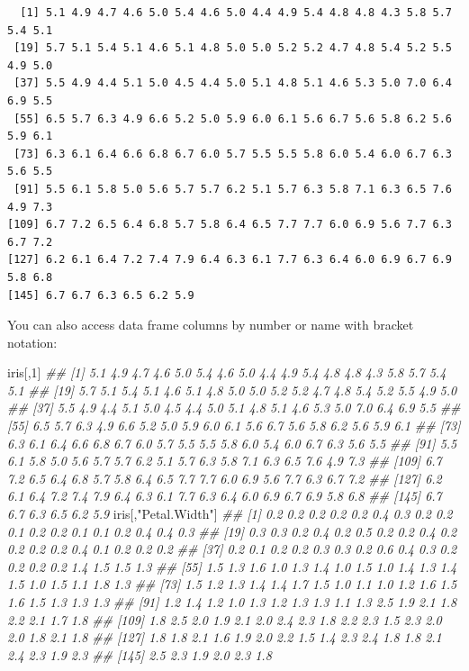 \documentclass[
  13,
  letterpaper,
]{report}
\newenvironment{Shaded}{\begin{snugshade}}{\end{snugshade}}
\newcommand{\DecValTok}[1]{\textcolor[rgb]{0.68,0.00,0.00}{#1}}
\newcommand{\DocumentationTok}[1]{\textcolor[rgb]{0.37,0.37,0.37}{\textit{#1}}}
\newcommand{\NormalTok}[1]{\textcolor[rgb]{0.00,0.23,0.31}{#1}}
\newcommand{\StringTok}[1]{\textcolor[rgb]{0.13,0.47,0.30}{#1}}
\begin{document}
\begin{verbatim}
  [1] 5.1 4.9 4.7 4.6 5.0 5.4 4.6 5.0 4.4 4.9 5.4 4.8 4.8 4.3 5.8 5.7 5.4 5.1
 [19] 5.7 5.1 5.4 5.1 4.6 5.1 4.8 5.0 5.0 5.2 5.2 4.7 4.8 5.4 5.2 5.5 4.9 5.0
 [37] 5.5 4.9 4.4 5.1 5.0 4.5 4.4 5.0 5.1 4.8 5.1 4.6 5.3 5.0 7.0 6.4 6.9 5.5
 [55] 6.5 5.7 6.3 4.9 6.6 5.2 5.0 5.9 6.0 6.1 5.6 6.7 5.6 5.8 6.2 5.6 5.9 6.1
 [73] 6.3 6.1 6.4 6.6 6.8 6.7 6.0 5.7 5.5 5.5 5.8 6.0 5.4 6.0 6.7 6.3 5.6 5.5
 [91] 5.5 6.1 5.8 5.0 5.6 5.7 5.7 6.2 5.1 5.7 6.3 5.8 7.1 6.3 6.5 7.6 4.9 7.3
[109] 6.7 7.2 6.5 6.4 6.8 5.7 5.8 6.4 6.5 7.7 7.7 6.0 6.9 5.6 7.7 6.3 6.7 7.2
[127] 6.2 6.1 6.4 7.2 7.4 7.9 6.4 6.3 6.1 7.7 6.3 6.4 6.0 6.9 6.7 6.9 5.8 6.8
[145] 6.7 6.7 6.3 6.5 6.2 5.9
\end{verbatim}

You can also access data frame columns by number or name with bracket
notation:

\begin{Shaded}
\begin{Highlighting}[]
\NormalTok{iris[,}\DecValTok{1}\NormalTok{]}
\DocumentationTok{\#\#   [1] 5.1 4.9 4.7 4.6 5.0 5.4 4.6 5.0 4.4 4.9 5.4 4.8 4.8 4.3 5.8 5.7 5.4 5.1}
\DocumentationTok{\#\#  [19] 5.7 5.1 5.4 5.1 4.6 5.1 4.8 5.0 5.0 5.2 5.2 4.7 4.8 5.4 5.2 5.5 4.9 5.0}
\DocumentationTok{\#\#  [37] 5.5 4.9 4.4 5.1 5.0 4.5 4.4 5.0 5.1 4.8 5.1 4.6 5.3 5.0 7.0 6.4 6.9 5.5}
\DocumentationTok{\#\#  [55] 6.5 5.7 6.3 4.9 6.6 5.2 5.0 5.9 6.0 6.1 5.6 6.7 5.6 5.8 6.2 5.6 5.9 6.1}
\DocumentationTok{\#\#  [73] 6.3 6.1 6.4 6.6 6.8 6.7 6.0 5.7 5.5 5.5 5.8 6.0 5.4 6.0 6.7 6.3 5.6 5.5}
\DocumentationTok{\#\#  [91] 5.5 6.1 5.8 5.0 5.6 5.7 5.7 6.2 5.1 5.7 6.3 5.8 7.1 6.3 6.5 7.6 4.9 7.3}
\DocumentationTok{\#\# [109] 6.7 7.2 6.5 6.4 6.8 5.7 5.8 6.4 6.5 7.7 7.7 6.0 6.9 5.6 7.7 6.3 6.7 7.2}
\DocumentationTok{\#\# [127] 6.2 6.1 6.4 7.2 7.4 7.9 6.4 6.3 6.1 7.7 6.3 6.4 6.0 6.9 6.7 6.9 5.8 6.8}
\DocumentationTok{\#\# [145] 6.7 6.7 6.3 6.5 6.2 5.9}
\NormalTok{iris[,}\StringTok{"Petal.Width"}\NormalTok{]}
\DocumentationTok{\#\#   [1] 0.2 0.2 0.2 0.2 0.2 0.4 0.3 0.2 0.2 0.1 0.2 0.2 0.1 0.1 0.2 0.4 0.4 0.3}
\DocumentationTok{\#\#  [19] 0.3 0.3 0.2 0.4 0.2 0.5 0.2 0.2 0.4 0.2 0.2 0.2 0.2 0.4 0.1 0.2 0.2 0.2}
\DocumentationTok{\#\#  [37] 0.2 0.1 0.2 0.2 0.3 0.3 0.2 0.6 0.4 0.3 0.2 0.2 0.2 0.2 1.4 1.5 1.5 1.3}
\DocumentationTok{\#\#  [55] 1.5 1.3 1.6 1.0 1.3 1.4 1.0 1.5 1.0 1.4 1.3 1.4 1.5 1.0 1.5 1.1 1.8 1.3}
\DocumentationTok{\#\#  [73] 1.5 1.2 1.3 1.4 1.4 1.7 1.5 1.0 1.1 1.0 1.2 1.6 1.5 1.6 1.5 1.3 1.3 1.3}
\DocumentationTok{\#\#  [91] 1.2 1.4 1.2 1.0 1.3 1.2 1.3 1.3 1.1 1.3 2.5 1.9 2.1 1.8 2.2 2.1 1.7 1.8}
\DocumentationTok{\#\# [109] 1.8 2.5 2.0 1.9 2.1 2.0 2.4 2.3 1.8 2.2 2.3 1.5 2.3 2.0 2.0 1.8 2.1 1.8}
\DocumentationTok{\#\# [127] 1.8 1.8 2.1 1.6 1.9 2.0 2.2 1.5 1.4 2.3 2.4 1.8 1.8 2.1 2.4 2.3 1.9 2.3}
\DocumentationTok{\#\# [145] 2.5 2.3 1.9 2.0 2.3 1.8}
\end{Highlighting}
\end{Shaded}
\end{document}

